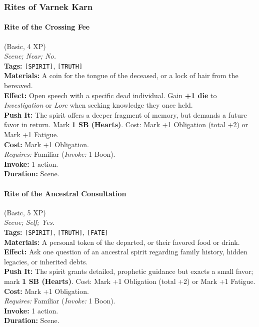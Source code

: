 \subsubsection*{Rites of Varnek Karn}

\paragraph{Rite of the Crossing Fee} (Basic, 4 XP) \hfill \\
\emph{Scene; Near; No.} \\
\textbf{Tags:} \texttt{[SPIRIT]}, \texttt{[TRUTH]} \\
\textbf{Materials:} A coin for the tongue of the deceased, or a lock of hair from the bereaved. \\
\textbf{Effect:} Open speech with a specific dead individual. Gain \textbf{+1 die} to \textit{Investigation} or \textit{Lore} when seeking knowledge they once held. \\
\textbf{Push It:} The spirit offers a deeper fragment of memory, but demands a future favor in return. Mark \textbf{1 SB (Hearts)}. Cost: Mark +1 Obligation (total +2) or Mark +1 Fatigue. \\
\textbf{Cost:} Mark +1 Obligation. \\
\textit{Requires:} Familiar (\textit{Invoke:} 1 Boon). \\
\textbf{Invoke:} 1 action. \\
\textbf{Duration:} Scene.

\paragraph{Rite of the Ancestral Consultation} (Basic, 5 XP) \hfill \\
\emph{Scene; Self; Yes.} \\
\textbf{Tags:} \texttt{[SPIRIT]}, \texttt{[TRUTH]}, \texttt{[FATE]} \\
\textbf{Materials:} A personal token of the departed, or their favored food or drink. \\
\textbf{Effect:} Ask one question of an ancestral spirit regarding family history, hidden legacies, or inherited debts. \\
\textbf{Push It:} The spirit grants detailed, prophetic guidance but exacts a small favor; mark \textbf{1 SB (Hearts)}. Cost: Mark +1 Obligation (total +2) or Mark +1 Fatigue. \\
\textbf{Cost:} Mark +1 Obligation. \\
\textit{Requires:} Familiar (\textit{Invoke:} 1 Boon). \\
\textbf{Invoke:} 1 action. \\
\textbf{Duration:} Scene.

